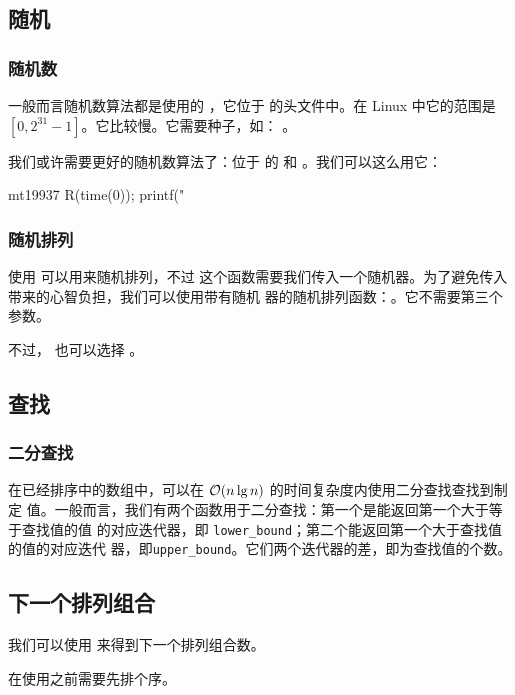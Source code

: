 \subsection{随机}
\subsubsection{随机数}
一般而言随机数算法都是使用的 ，它位于  的头文件中。在
Linux 中它的范围是 $[0, 2^{31} - 1]$。它比较慢。它需要种子，如：
。

我们或许需要更好的随机数算法了：位于  的  和
。我们可以这么用它：
\begin{Cpp}
mt19937 R(time(0));
printf("%
\end{Cpp}

\subsubsection{随机排列}
使用  可以用来随机排列，不过
这个函数需要我们传入一个随机器。为了避免传入带来的心智负担，我们可以使用带有随机
器的随机排列函数：。它不需要第三个参数。

不过， 也可以选择 。



\subsection{查找}
\subsubsection{二分查找}
在已经排序中的数组中，可以在 $\mathcal{O}(n\lg n)$ 的时间复杂度内使用二分查找查找到制定
值。一般而言，我们有两个函数用于二分查找：第一个是能返回第一个大于等于查找值的值
的对应迭代器，即 \verb|lower_bound|；第二个能返回第一个大于查找值的值的对应迭代
器，即\verb|upper_bound|。它们两个迭代器的差，即为查找值的个数。



\subsection{下一个排列组合}
我们可以使用  来得到下一个排列组合数。

在使用之前需要先排个序。




